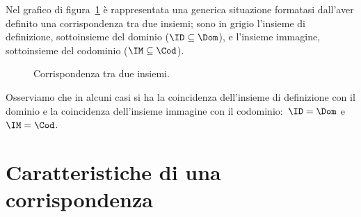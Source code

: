 Nel grafico di figura~\ref{fig:C.3} è rappresentata una generica situazione formatasi dall'aver definito una corrispondenza tra due insiemi; sono in grigio l'insieme di definizione, sottoinsieme del dominio ($\ID \subseteq \Dom$),
e l'insieme immagine, sottoinsieme del codominio ($\IM \subseteq \Cod$).
\begin{figure}[htb]
 \centering
 \caption{Corrispondenza tra due insiemi.}\label{fig:C.3}
\end{figure}

Osserviamo che in alcuni casi si ha la coincidenza dell'insieme di definizione con il dominio e la coincidenza dell'insieme immagine con il codominio:~$\ID=\Dom$ e~$\IM=\Cod$.

\newpage

\section{Caratteristiche di una corrispondenza}
